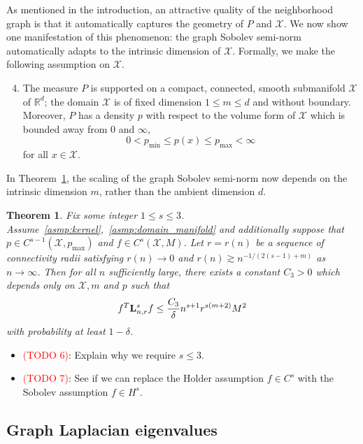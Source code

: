 \documentclass{article}
\newcommand{\Reals}{\mathbb{R}}
\newcommand{\1}{\mathbf{1}}
\newcommand{\Lap}{{\bf L}}
\newcommand{\Xset}{\mathcal{X}}
\theoremstyle{alden}
\theoremstyle{aldenthm}
\newtheorem{theorem}{Theorem}
\theoremstyle{definition}
\theoremstyle{remark}
\begin{document}
As mentioned in the introduction, an attractive quality of the neighborhood graph is that it automatically captures the geometry of $P$ and $\Xset$. We now show one manifestation of this phenomenon: the graph Sobolev semi-norm automatically adapts to the intrinsic dimension of $\Xset$. Formally, we make the following assumption on $\Xset$.
\begin{enumerate}[label=(P\arabic*)]
	\setcounter{enumi}{3}
	\item 
	\label{asmp:domain_manifold}
	The measure $P$ is supported on a compact, connected, smooth submanifold $\Xset$ of $\Reals^d$; the domain $\Xset$ is of fixed dimension $1 \leq m \leq d$ and without boundary. Moreover, $P$ has a density $p$ with respect to the volume form of $\Xset$ which is bounded away from $0$ and $\infty$,
	\begin{equation*}
	0 < p_{\min} \leq p(x) \leq p_{\max} < \infty
	\end{equation*}
	for all $x \in \Xset$.
\end{enumerate}
In Theorem~\ref{thm:manifold_graph_sobolev_seminorm}, the scaling of the graph Sobolev semi-norm now depends on the intrinsic dimension $m$, rather than the ambient dimension $d$.
\begin{theorem}
	\label{thm:manifold_graph_sobolev_seminorm}
	Fix some integer $1 \leq s \leq 3$. Assume~\ref{asmp:kernel},~\ref{asmp:domain_manifold} and additionally suppose that $p \in C^{s - 1}(\Xset,p_{\max})$ and $f \in C^s(\Xset,M)$. Let $r = r(n)$ be a sequence of connectivity radii satisfying $r(n) \to 0$ and $r(n) \gtrsim n^{-1/(2(s - 1) + m)}$ as $n \to \infty$. Then for all $n$ sufficiently large, there exists a constant $C_3 > 0$ which depends only on $\Xset, m$ and $p$ such that
	\begin{equation*}
	f^T \Lap_{n,r}^s f \leq \frac{C_3}{\delta}n^{s + 1}r^{s(m + 2)}M^2
	\end{equation*}
	with probability at least $1 - \delta$.
\end{theorem}
\begin{itemize}
	\item \textcolor{red}{(TODO 6)}: Explain why we require $s \leq 3$.
	\item \textcolor{red}{(TODO 7)}: See if we can replace the Holder assumption $f \in C^s$ with the Sobolev assumption $f \in H^s$.
\end{itemize}

\subsection{Graph Laplacian eigenvalues}
\end{document}
